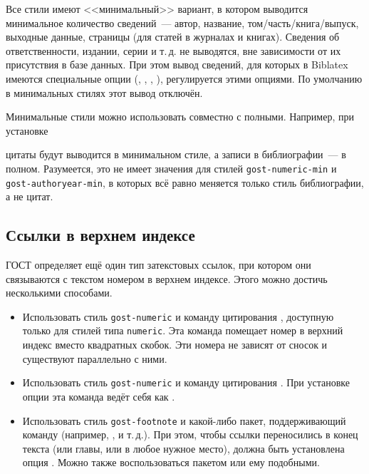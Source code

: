 \documentclass[10pt,a4paper,headings=small,numbers=enddot,english,russian]{ltxdockit}[2011/03/25]
\newcommand*{\biblatex}{Biblatex\xspace}
\newcommand*{\bibsty}{\texttt}
\begin{document}
\begin{marglist}
Все стили имеют <<минимальный>> вариант, в котором выводится минимальное количество
сведений~--- автор, название, том\slash часть\slash книга\slash выпуск, 
выходные данные, страницы (для статей в журналах и книгах).
Сведения об ответственности, издании, серии и т.\,д. не выводятся, вне зависимости от их присутствия
в базе данных. При этом вывод сведений, для которых в \biblatex имеются специальные опции 
(, , , ), регулируется 
этими опциями. По умолчанию в минимальных стилях этот вывод отключён. 

Минимальные стили можно использовать совместно с полными. Например,
при установке

\begin{ltxcode}
\usepackage[%
    citestyle=gost-footnote-min, 
    bibstyle=gost-footnote,
    ...
]{biblatex}
\end{ltxcode}

цитаты будут выводится в минимальном стиле, а записи в библиографии~--- в полном.
Разумеется, это не имеет значения для стилей \bibsty{gost-numeric-min} и 
\bibsty{gost-authoryear-min}, 
в которых всё равно меняется только стиль библиографии, а не цитат.

\end{marglist}

\subsection{Ссылки в верхнем индексе}
\label{sec:superscript}

ГОСТ определяет ещё один тип затекстовых ссылок, при котором они 
связываются с текстом номером в верхнем индексе. Этого можно достичь несколькими способами. 

\begin{itemize}
\item Использовать стиль \bibsty{gost-numeric} и команду цитирования  
, доступную только для стилей типа \bibsty{numeric}. Эта команда
помещает номер в верхний индекс вместо квадратных скобок. Эти номера не зависят от 
сносок  и существуют параллельно с ними.
\item Использовать стиль \bibsty{gost-numeric} и команду цитирования
. При установке опции  эта команда ведёт себя 
как .
\item Использовать стиль \bibsty{gost-footnote} и какой-либо пакет, поддерживающий команду  (например, ,  и т.\,д.). 
При этом, чтобы ссылки переносились в конец текста (или главы, или в любое 
нужное место), должна быть установлена
опция . Можно также воспользоваться 
пакетом  или ему подобными.
\end{itemize}
\end{document}

